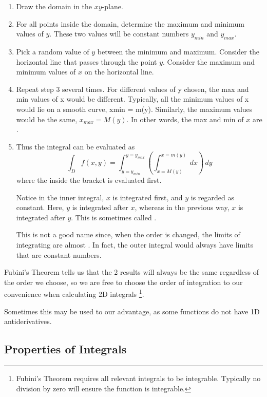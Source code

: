 \documentclass[11pt,fleqn]{book} %
\begin{document}
\begin{enumerate}
    \item Draw the domain in the $xy$-plane.

    \item For all points inside the domain, determine the maximum and minimum values of $y$. These two values will be constant numbers $y_{min}$ and $y_{max}$.

    \item Pick a random value of $y$ between the minimum and maximum. Consider the horizontal line that passes through the point $y$. Consider the maximum and minimum values of $x$ on the horizontal line. 

    \item Repeat step 3 several times. For different values of y chosen, the max and min values of x would be different. Typically, all the minimum values of x would lie on a smooth curve, xmin = m(y). Similarly, the maximum values would be the same, $x_{max} = M(y)$. In other words, the max and min of $x$ are .

    \item Thus the integral can be evaluated as $$\int_D f(x, y) = \int_{y=y_{min}}^{y=y_{max}} \left( \int_{x=M(y)}^{x=m(y)} \,dx \right) \,dy$$ where the  inside the bracket is evaluated first. 
    
    Notice in the inner integral, $x$ is integrated first, and $y$ is regarded as constant. Here, $y$ is integrated after $x$, whereas in the previous way, $x$ is integrated after $y$. This is sometimes called .

    This is not a good name since, when the order is changed, the limits of integrating are almost . In fact, the outer integral would always have limits that are constant numbers.
\end{enumerate}

Fubini's Theorem tells us that the 2 results will always be the same regardless of the order we choose, so we are free to choose the order of integration to our convenience when calculating 2D integrals \footnote{Fubini's Theorem requires all relevant integrals to be integrable. Typically no division by zero will ensure the function is integrable. }. 

Sometimes this may be used to our advantage, as some functions do not have 1D antiderivatives.

\subsection*{Properties of Integrals}
\end{document}
